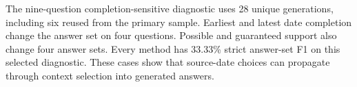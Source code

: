 The nine-question completion-sensitive diagnostic uses 28 unique generations, including six reused from the primary sample.
Earliest and latest date completion change the answer set on four questions.
Possible and guaranteed support also change four answer sets.
Every method has 33.33\% strict answer-set F1 on this selected diagnostic.
These cases show that source-date choices can propagate through context selection into generated answers.
